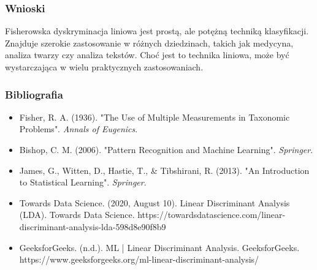 \documentclass{beamer}
\begin{document}
\begin{frame}
    \frametitle{Wnioski}
    Fisherowska dyskryminacja liniowa jest prostą, ale potężną techniką klasyfikacji. Znajduje szerokie zastosowanie w różnych dziedzinach, takich jak medycyna, analiza twarzy czy analiza tekstów. Choć jest to technika liniowa, może być wystarczająca w wielu praktycznych zastosowaniach.
\end{frame}

\begin{frame}
    \frametitle{Bibliografia}
    \begin{itemize}
        \item Fisher, R. A. (1936). "The Use of Multiple Measurements in Taxonomic Problems". \textit{Annals of Eugenics}.
        \item Bishop, C. M. (2006). "Pattern Recognition and Machine Learning". \textit{Springer}.
        \item James, G., Witten, D., Hastie, T., \& Tibshirani, R. (2013). "An Introduction to Statistical Learning". \textit{Springer}.
        \item Towards Data Science. (2020, August 10). Linear Discriminant Analysis (LDA). Towards Data Science. https://towardsdatascience.com/linear-discriminant-analysis-lda-598d8e90f8b9
        \item GeeksforGeeks. (n.d.). ML | Linear Discriminant Analysis. GeeksforGeeks. https://www.geeksforgeeks.org/ml-linear-discriminant-analysis/
    \end{itemize}
\end{frame}
\end{document}
